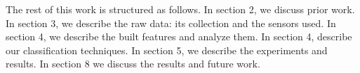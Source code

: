\documentclass{llncs}
\begin{document}


The rest of this work is structured as follows. In section 2, we discuss prior work. In section 3, we describe the raw data: its collection and the sensors used. In section 4, we describe the built features and analyze them. In section 4, describe our classification techniques. In section 5, we describe the experiments and results. In section 8 we discuss the results and future work.
\end{document}
